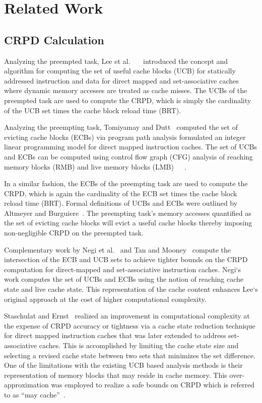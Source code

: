 \section{Related Work}\label{sec:related}

\subsection {CRPD Calculation}\label{sec:crpd_related_work}
Analyzing the preempted task, Lee et al.~\cite{lee:96}~\cite{lee:97}~\cite{lee:98} introduced the concept and algorithm for computing the set of useful cache blocks (UCB) for statically addressed instruction and data for direct mapped and set-associative caches where dynamic memory accesses are treated as cache misses.  The UCBs of the preempted task are used to compute the CRPD, which is simply the cardinality of the UCB set times the cache block reload time (BRT).

Analyzing the preempting task, Tomiyamay and Dutt~\cite{tomiyamay:00} computed the set of evicting cache blocks (ECBs) via program path analysis formulated an integer linear programming model for direct mapped instruction caches.  The set of UCBs and ECBs can be computed using control flow graph (CFG) analysis of reaching memory blocks (RMB) and live memory blocks (LMB)~\cite{lee:96}~\cite{lee:97}~\cite{lee:98}.

In a similar fashion, the ECBs of the preempting task are used to compute the CRPD, which is again the cardinality of the ECB set times the cache block reload time (BRT). Formal definitions of UCBs and ECBs were outlined by Altmeyer and Burguiere~\cite{altmeyer:11c}.  The preempting task’s memory accesses quantified as the set of evicting cache blocks will evict a useful cache blocks thereby imposing non-negligible CRPD on the preempted task.

Complementary work by Negi et al.~\cite{negi:03} and Tan and Mooney~\cite{tan:04} compute the intersection of the ECB and UCB sets to achieve tighter bounds on the CRPD computation for direct-mapped and set-associative instruction caches. Negi`s work computes the set of UCBs and ECBs using the notion of reaching cache state and live cache state. This representation of the cache content enhances Lee`s original approach at the cost of higher computational complexity.

Staschulat and Ernst~\cite{staschulat:05c} realized an improvement in computational complexity at the expense of CRPD accuracy or tightness via a cache state reduction technique for direct mapped instruction caches that was later extended to address set-associative caches. This is accomplished by limiting the cache state size and selecting a revised cache state between two sets that minimizes the set difference.  One of the limitations with the existing UCB based analysis methods is their representation of memory blocks that may reside in cache memory.  This over-approximation was employed to realize a safe bounds on CRPD which is referred to as “may cache”~\cite{altmeyer:11c}.

